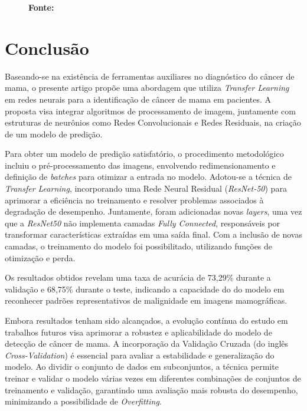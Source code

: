 \begin{figure}[ht]
\begin{minipage}[b]{0.45\textwidth}
        \label{fig:predicao_com}
        \textbf{\footnotesize Fonte: \href{https://www.kaggle.com/datasets/awsaf49/cbis-ddsm-breast-cancer-image-dataset}{\cite{newdatabase}}}
    \end{minipage}
\end{figure}




\section{\esp Conclusão} \label{conclusion}
Baseando-se na existência de ferramentas auxiliares no diagnóstico do câncer de mama, o presente artigo propõe uma abordagem que utiliza \textit{Transfer Learning} em redes neurais para a identificação de câncer de mama em pacientes. A proposta visa integrar algoritmos de processamento de imagem, juntamente com estruturas de neurônios como Redes Convolucionais e Redes Residuais, na criação de um modelo de predição. 

Para obter um modelo de predição satisfatório, o procedimento metodológico incluiu o pré-processamento das imagens, envolvendo redimensionamento e definição de \textit{batches} para otimizar a entrada no modelo. Adotou-se a técnica de \textit{Transfer Learning}, incorporando uma Rede Neural Residual (\textit{ResNet-50}) para aprimorar a eficiência no treinamento e resolver problemas associados à degradação de desempenho. Juntamente, foram adicionadas novas \textit{layers}, uma vez que a \textit{ResNet50} não implementa camadas \textit{Fully Connected}, responsáveis por transformar características extraídas em uma saída final. Com a inclusão de novas camadas, o treinamento do modelo foi possibilitado, utilizando funções de otimização e perda.

Os resultados obtidos revelam uma taxa de acurácia de 73,29\% durante a validação e 68,75\% durante o teste, indicando a capacidade do do modelo em reconhecer padrões representativos de malignidade em imagens mamográficas. 


Embora resultados tenham sido alcançados, a evolução contínua do estudo em trabalhos futuros visa aprimorar a robustez e aplicabilidade do modelo de detecção de câncer de mama. A incorporação da Validação Cruzada (do inglês \textit{Cross-Validation}) é essencial para avaliar a estabilidade e generalização do modelo. Ao dividir o conjunto de dados em subconjuntos, a técnica permite treinar e validar o modelo várias vezes em diferentes combinações de conjuntos de treinamento e validação, garantindo uma avaliação mais robusta do desempenho, minimizando a possibilidade de \textit{Overfitting}.

